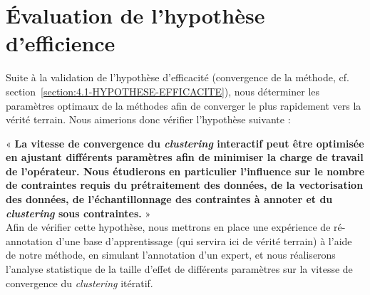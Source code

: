 \section{Évaluation de l'hypothèse d'efficience}
\label{section:4.2-HYPOTHESE-EFFICIENCE}

	Suite à la validation de l'hypothèse d'efficacité (convergence de la méthode, cf. section~\ref{section:4.1-HYPOTHESE-EFFICACITE}), nous déterminer les paramètres optimaux de la méthodes afin de converger le plus rapidement vers la vérité terrain.
	Nous aimerions donc vérifier l'hypothèse suivante :

	\begin{tcolorbox}[
		title=\faVial~\textbf{Hypothèse d'efficience}~\faVial,
		colback=colorTcolorboxHypothesis!15,
		colframe=colorTcolorboxHypothesis!75,
		width=\linewidth
	]

		« \textbf{
			La vitesse de convergence du \textit{clustering} interactif peut être optimisée en ajustant différents paramètres afin de minimiser la charge de travail de l'opérateur. Nous étudierons en particulier l'influence sur le nombre de contraintes requis du prétraitement des données, de la vectorisation des données, de l'échantillonnage des contraintes à annoter et du \textit{clustering} sous contraintes.
		} » \\
		
		Afin de vérifier cette hypothèse, nous mettrons en place une expérience de ré-annotation d'une base d'apprentissage (qui servira ici de vérité terrain) à l'aide de notre méthode, en simulant l'annotation d'un expert, et nous réaliserons l'analyse statistique de la taille d'effet de différents paramètres sur la vitesse de convergence du \textit{clustering} itératif.
		

\end{tcolorbox}
